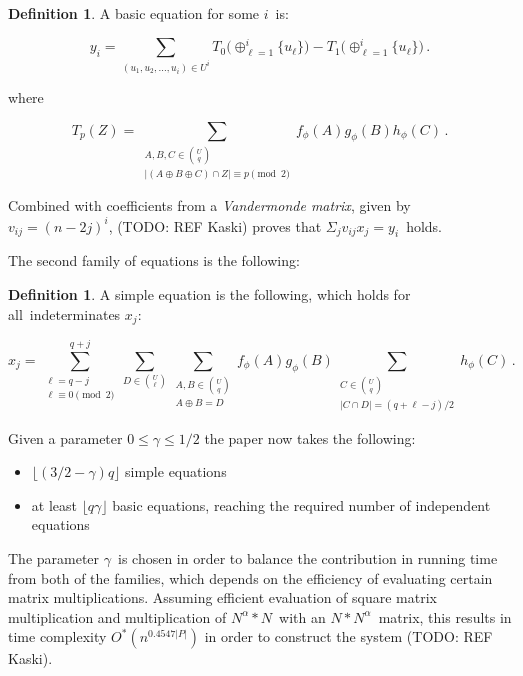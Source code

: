 \documentclass[a4paper,11pt]{report}
\theoremstyle{plain}
\theoremstyle{definition}
\newtheorem{defn}[thm]{Definition} %
\begin{document}
\begin{defn}
A basic equation for some $i$ is:

\begin{equation}
\label{eq:yi}
y_i=
\sum_{(u_1,u_2,\ldots,u_i)\in U^i}
T_0\bigl(\oplus_{\ell=1}^i\{u_\ell\}\bigr)
-T_1\bigl(\oplus_{\ell=1}^i\{u_\ell\}\bigr)\,.
\end{equation}

where

\begin{equation}
T_p(Z)=
\sum_{\substack{A,B,C\in\binom{U}{q}\\|(A\oplus B\oplus C)\cap Z|\equiv p\!\!\!\pmod 2}}
f_\phi(A)g_\phi(B)h_\phi(C)\,.
\end{equation}
\end{defn}

Combined with coefficients from a \emph{Vandermonde matrix}, given by $v_{ij} = (n - 2j)^i$, (TODO: REF Kaski) proves that $\Sigma_j v_{ij}x_{j} = y_i$ holds.

The second family of equations is the following:

\begin{defn}
A simple equation is the following, which holds for all indeterminates $x_j$:

\begin{equation}
\label{eq:xj-direct}
x_j
=
\sum_{\substack{\ell=q-j\\\ell\equiv 0\!\!\!\!\!\pmod 2}}^{q+j}
\sum_{D\in\binom{U}{\ell}}
\sum_{\substack{A,B\in\binom{U}{q}\\A\oplus B=D}}
f_\phi(A)g_\phi(B)
\sum_{\substack{C\in\binom{U}{q}\\|C\cap D|=(q+\ell-j)/2}}h_\phi(C)\,.
\end{equation}

\end{defn}

Given a parameter $0 \leq \gamma \leq 1/2$ the paper now takes the following:
\begin{itemize}
\item $\lfloor (3/2 - \gamma)q \rfloor$ simple equations
\item at least $\lfloor q \gamma \rfloor$ basic equations, reaching the required number of independent equations
\end{itemize}

The parameter $\gamma$ is chosen in order to balance the contribution in running time from both of the families, which depends on the efficiency of evaluating certain matrix multiplications.
Assuming efficient evaluation of square matrix multiplication and multiplication of $N^\alpha * N$ with an $N * N^\alpha$ matrix, this results in time complexity $O^*(n^{0.4547|P|})$ in order to construct the system (TODO: REF Kaski).
\end{document}
